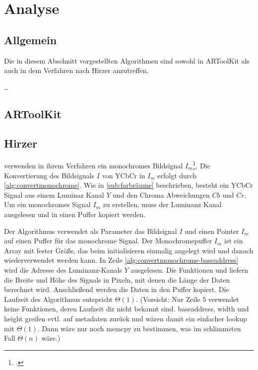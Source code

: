 \chapter{Analyse} %
\label{cha:analyse}
\begin{comment}
	Detailierte Beschreibung der Algorithmen inkl. O-Notation (Nitty-Gritty Darstellung der Algos)
	1. ARToolKitPlus
	2. Zissermann/Clarke
	Analyse: Die auswertung nach den Kriterein aus Kap. Vorgehen OHNE WERTUNG! Nur die Daten erheben und auswerten.
\end{comment}

\section{Allgemein} %
\label{sec:allgemein}

Die in diesem Abschnitt vorgestellten Algorithmen sind sowohl in ARToolKit als auch in dem Verfahren nach Hirzer
 anzutreffen.

\ldots


\section{ARToolKit} %
\label{sec:artoolkit}


\section{Hirzer} %
\label{sec:hirzer}

\citeauthor{clarke96} verwenden in ihrem Verfahren ein monochromes Bildsignal $I_m$\footcite[Vgl.][S.~417]{clarke96}.
 Die Konvertierung des Bildsignals $I$ von YCbCr in $I_m$ erfolgt durch \autoref{alg:convertmonochrome}. Wie in
 \autoref{sub:farbräume} beschrieben, besteht ein YCbCr Signal aus einem Luminaz Kanal $Y$ und den Chroma Abweichungen
 $Cb$ und $Cr$. Um ein monochromes Signal $I_m$ zu erstellen, muss der Luminanz Kanal ausgelesen und in einen Puffer
 kopiert werden.



Der Algorithmus verwendet als Parameter das Bildsignal $I$ und einen Pointer $I_m$ auf einen Puffer für das monochrome
 Signal. Der Monochromepuffer $I_m$ ist ein Array mit fester Größe, das beim initialisieren einmalig angelegt wird und
 danach wiederverwendet werden kann. In Zeile \ref{alg:convertmonochrome-baseaddress} wird die Adresse des
 Luminanz-Kanals $Y$ ausgelesen. Die Funktionen  und  liefern die Breite und Höhe des
 Signals in Pixeln, mit denen die Länge der Daten berechnet wird. Anschließend werden die Daten in den Puffer kopiert.
 Die Laufzeit des Algorithmus entspricht $\Theta(1)$. (Vorsicht: Nur Zeile 5 verwendet keine Funktionen, deren Laufzeit
 dir nicht bekannt sind. baseaddress, width und height greifen evtl. auf metadaten zurück und wären damit ein einfacher
 lookup mit $\Theta(1)$. Dann wäre nur noch memcpy zu bestimmen, was im schlimmsten Fall $\Theta(n)$ wäre.)

